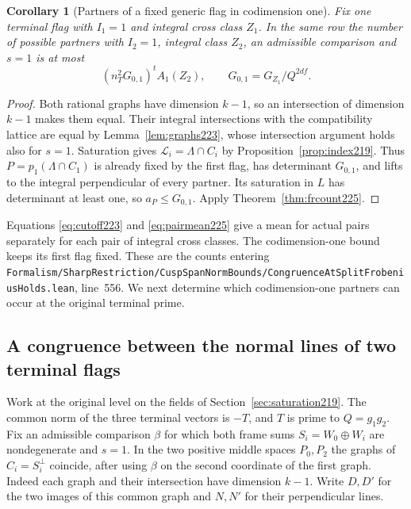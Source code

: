 \documentclass[a4paper,11pt]{article}
\newtheorem{corollary}[proposition]{Corollary}
\theoremstyle{definition}
\theoremstyle{remark}
\newcommand{\srcloc}[2]{{\small\nolinkurl{#1.lean}}, line~#2}
\numberwithin{equation}{section}
\begin{document}
\begin{corollary}[Partners of a fixed generic flag in codimension one]
\label{cor:partner225}
Fix one terminal flag with \(I_1=1\) and integral cross
class \(Z_1\). In the same row the number of possible
partners with \(I_2=1\), integral class \(Z_2\), an
admissible comparison and \(s=1\) is at most
\[
             (n_T^2 G_{0,1})^t A_1(Z_2),
             \qquad G_{0,1}=G_{Z_1}/Q^{2df}.
\]
\end{corollary}
\begin{proof}
Both rational graphs have dimension \(k-1\), so an
intersection of dimension \(k-1\) makes them equal. Their
integral intersections with the compatibility lattice are
equal by Lemma~\ref{lem:graphs223}, whose intersection
argument holds also for \(s=1\). Saturation gives
\(\mathcal L_i=\Lambda\cap C_i\) by
Proposition~\ref{prop:index219}. Thus \(P=p_1(\Lambda\cap C_1)\)
is already fixed by the first flag, has determinant \(G_{0,1}\),
and lifts to the integral perpendicular of every partner.
Its saturation in \(L\) has determinant at least one, so
\(a_P\le G_{0,1}\). Apply Theorem~\ref{thm:frcount225}.
\end{proof}

Equations \eqref{eq:cutoff223} and \eqref{eq:pairmean225}
give a mean for actual pairs separately for each pair of
integral cross classes. The codimension-one bound keeps its
first flag fixed. These are the counts entering
\srcloc{Formalism/SharpRestriction/CuspSpanNormBounds/CongruenceAtSplitFrobeniusHolds}{556}.
We next determine which codimension-one partners can occur at the original terminal prime.

\subsection{A congruence between the normal lines of two terminal flags}\label{nav:IX-16}
\label{sec:normal227}

Work at the original level on the fields of
Section~\ref{sec:saturation219}. The common norm of the three
terminal vectors is \(-T\), and \(T\) is prime to \(Q=g_1g_2\).
Fix an admissible comparison \(\beta\) for which both frame sums
\(S_i=W_0\oplus W_i\) are nondegenerate and \(s=1\).
In the two positive middle spaces \(P_0,P_2\) the graphs of
\(C_i=S_i^\perp\) coincide, after using \(\beta\) on the
second coordinate of the first graph. Indeed each graph and
their intersection have dimension \(k-1\). Write \(D,D'\)
for the two images of this common graph and \(N,N'\) for
their perpendicular lines.
\end{document}

